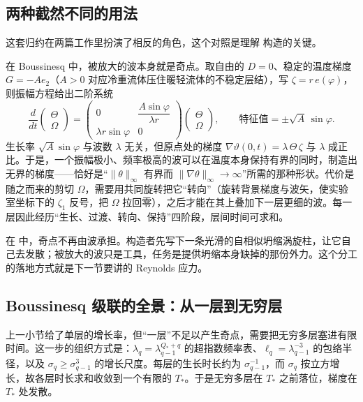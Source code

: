 \subsection{两种截然不同的用法}

这套归约在两篇工作里扮演了相反的角色，这个对照是理解 \NS{} 构造的关键。

在 Boussinesq 中，被放大的波本身就是奇点。取自由的 $D=0$、稳定的温度梯度 $G=-Ae_{2}$（$A>0$ 对应冷重流体压住暖轻流体的不稳定层结），写 $\zeta=r\,e(\varphi)$，则振幅方程给出二阶系统
\begin{equation}
\frac{d}{dt}\begin{pmatrix}\Theta\\ \Omega\end{pmatrix}
=\begin{pmatrix}0 & \dfrac{A\sin\varphi}{\lambda r}\\[2mm] \lambda r\sin\varphi & 0\end{pmatrix}
\begin{pmatrix}\Theta\\ \Omega\end{pmatrix},
\qquad\text{特征值}=\pm\sqrt{A}\,\sin\varphi .
\end{equation}
生长率 $\sqrt{A}\sin\varphi$ 与波数 $\lambda$ 无关，但原点处的梯度 $\nabla\vartheta(0,t)=\lambda\,\Theta\,\zeta$ 与 $\lambda$ 成正比。于是，一个振幅极小、频率极高的波可以在温度本身保持有界的同时，制造出无界的梯度——恰好是“$\|\theta\|_{\infty}$ 有界而 $\|\nabla\theta\|_{\infty}\to\infty$”所需的那种形状。代价是随之而来的剪切 $\Omega$，需要用共同旋转把它“转向”（旋转背景梯度与波矢，使实验室坐标下的 $\zeta_{1}$ 反号，把 $\Omega$ 拉回零），之后才能在其上叠加下一层更细的波。每一层因此经历“生长、过渡、转向、保持”四阶段，层间时间可求和。

在 \NS{} 中，奇点不再由波承担。构造者先写下一条光滑的自相似坍缩涡旋柱，让它自己去发散；被放大的波只是工具，任务是提供坍缩本身缺掉的那份外力。这个分工的落地方式就是下一节要讲的 Reynolds 应力。

\subsection{Boussinesq 级联的全景：从一层到无穷层}

上一小节给了单层的增长率，但“一层”不足以产生奇点，需要把无穷多层塞进有限时间。这一步的组织方式是：$\lambda_{q}=\lambda_{q-1}^{Q_{*}+q}$ 的超指数频率表、$\ell_{q}=\lambda_{q-1}^{-3}$ 的包络半径，以及 $\sigma_{q}\ge\sigma_{q-1}^{3}$ 的增长尺度。每层的生长时长约为 $\sigma_{q-1}^{-1}$，而 $\sigma_{q}$ 按立方增长，故各层时长求和收敛到一个有限的 $T_{*}$。于是无穷多层在 $T_{*}$ 之前落位，梯度在 $T_{*}$ 处发散。

